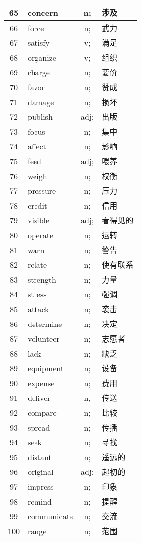 \documentclass[UTF-8]{article}
\begin{document}
\begin{longtable}{c|p{6cm}|c|p{6cm}}
\hline        65& concern& n;& 涉及 \\
\hline        66& force& n;& 武力 \\
\hline        67& satisfy& v;& 满足 \\
\hline        68& organize& v;& 组织 \\
\hline        69& charge& n;& 要价 \\
\hline        70& favor& n;& 赞成 \\
\hline        71& damage& n;& 损坏 \\
\hline        72& publish& adj;& 出版 \\
\hline        73& focus& n;& 集中 \\
\hline        74& affect& n;& 影响 \\
\hline        75& feed& adj;& 喂养 \\
\hline        76& weigh& n;& 权衡 \\
\hline        77& pressure& n;& 压力 \\
\hline        78& credit& n;& 信用 \\
\hline        79& visible& adj;& 看得见的 \\
\hline        80& operate& n;& 运转 \\
\hline        81& warn& n;& 警告 \\
\hline        82& relate& n;& 使有联系 \\
\hline        83& strength& n;& 力量 \\
\hline        84& stress& n;& 强调 \\
\hline        85& attack& n;& 袭击 \\
\hline        86& determine& n;& 决定 \\
\hline        87& volunteer& n;& 志愿者 \\
\hline        88& lack& n;& 缺乏 \\
\hline        89& equipment& n;& 设备 \\
\hline        90& expense& n;& 费用 \\
\hline        91& deliver& n;& 传送 \\
\hline        92& compare& n;& 比较 \\
\hline        93& spread& n;& 传播 \\
\hline        94& seek& n;& 寻找 \\
\hline        95& distant& n;& 遥远的 \\
\hline        96& original& adj;& 起初的 \\
\hline        97& impress& n;& 印象 \\
\hline        98& remind& n;& 提醒 \\
\hline        99& communicate& n;& 交流 \\
\hline        100& range& n;& 范围 \\
\end{longtable}
\end{document}
